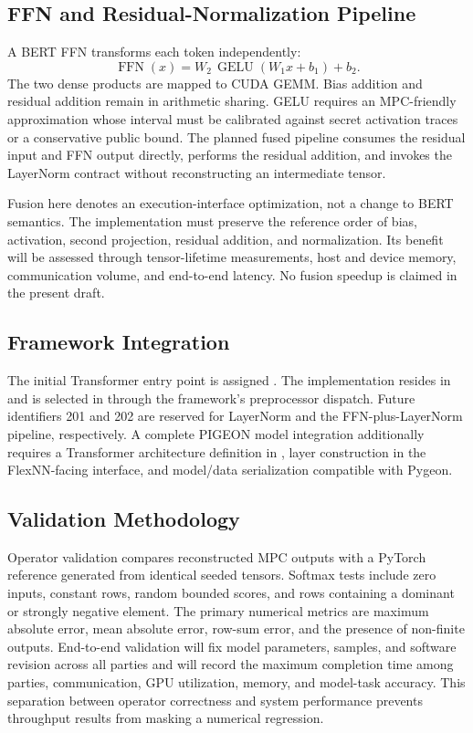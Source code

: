 \subsection{FFN and Residual-Normalization Pipeline}
\label{sec:ffn}
A BERT FFN transforms each token independently:
\begin{equation}
    \operatorname{FFN}(x)=W_2\,\operatorname{GELU}(W_1x+b_1)+b_2.
    \label{eq:ffn}
\end{equation}
The two dense products are mapped to CUDA GEMM. Bias addition and residual addition remain in arithmetic sharing. GELU requires an MPC-friendly approximation whose interval must be calibrated against secret activation traces or a conservative public bound. The planned fused pipeline consumes the residual input and FFN output directly, performs the residual addition, and invokes the LayerNorm contract without reconstructing an intermediate tensor.

Fusion here denotes an execution-interface optimization, not a change to BERT semantics. The implementation must preserve the reference order of bias, activation, second projection, residual addition, and normalization. Its benefit will be assessed through tensor-lifetime measurements, host and device memory, communication volume, and end-to-end latency. No fusion speedup is claimed in the present draft.

\subsection{Framework Integration}
The initial Transformer entry point is assigned . The implementation resides in  and is selected in  through the framework's preprocessor dispatch. Future identifiers 201 and 202 are reserved for LayerNorm and the FFN-plus-LayerNorm pipeline, respectively. A complete PIGEON model integration additionally requires a Transformer architecture definition in , layer construction in the FlexNN-facing interface, and model/data serialization compatible with Pygeon.

\subsection{Validation Methodology}
Operator validation compares reconstructed MPC outputs with a PyTorch reference generated from identical seeded tensors. Softmax tests include zero inputs, constant rows, random bounded scores, and rows containing a dominant or strongly negative element. The primary numerical metrics are maximum absolute error, mean absolute error, row-sum error, and the presence of non-finite outputs. End-to-end validation will fix model parameters, samples, and software revision across all parties and will record the maximum completion time among parties, communication, GPU utilization, memory, and model-task accuracy. This separation between operator correctness and system performance prevents throughput results from masking a numerical regression.

